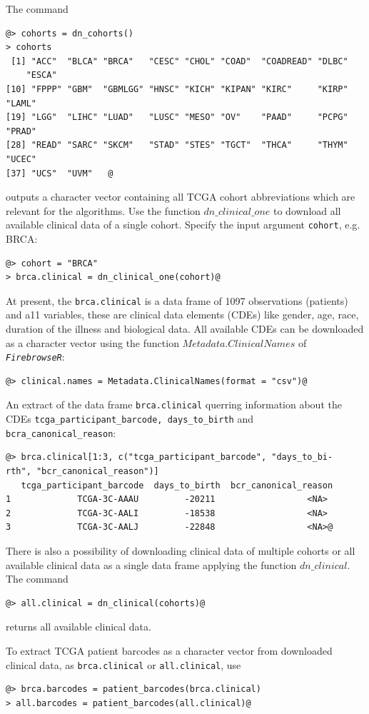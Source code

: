 \documentclass{TechReport}
\begin{document}
The command
\begin{lstlisting}[style=base]
@> cohorts = dn_cohorts()
> cohorts
 [1] "ACC"  "BLCA" "BRCA"   "CESC" "CHOL" "COAD"  "COADREAD" "DLBC"  
    "ESCA"    
[10] "FPPP" "GBM"  "GBMLGG" "HNSC" "KICH" "KIPAN" "KIRC"     "KIRP"  "LAML"    
[19] "LGG"  "LIHC" "LUAD"   "LUSC" "MESO" "OV"    "PAAD"     "PCPG"  "PRAD"    
[28] "READ" "SARC" "SKCM"   "STAD" "STES" "TGCT"  "THCA"     "THYM"  "UCEC"    
[37] "UCS"  "UVM"   @
\end{lstlisting}
outputs a character vector containing all TCGA cohort abbreviations
which are relevant for the algorithms. Use the function
$dn\_clinical\_one$ to download all available clinical data of a
single cohort. Specify the input argument {\tt cohort}, e.g. BRCA:
\begin{lstlisting}[style=base]
@> cohort = "BRCA"
> brca.clinical = dn_clinical_one(cohort)@
\end{lstlisting}
At present, the {\tt brca.clinical} is a data frame of 1097 observations (patients)
and a11 variables, these are clinical data elements (CDEs) like 
gender, age, race, duration of the illness and biological data. All available CDEs
can be downloaded as a character vector using the 
function $Metadata.ClinicalNames$ of \texttt{\em FirebrowseR}:
\begin{lstlisting}[style=base]
@> clinical.names = Metadata.ClinicalNames(format = "csv")@
\end{lstlisting}
An extract of the data frame {\tt brca.clinical} querring information about the CDEs
{\tt tcga\_participant\_barcode, days\_to\_birth} and {\tt bcra\_canonical\_reason}:
\begin{lstlisting}[style=base]
@> brca.clinical[1:3, c("tcga_participant_barcode", "days_to_bi-
rth", "bcr_canonical_reason")]
   tcga_participant_barcode  days_to_birth  bcr_canonical_reason
1             TCGA-3C-AAAU         -20211                  <NA>
2             TCGA-3C-AALI         -18538                  <NA>
3             TCGA-3C-AALJ         -22848                  <NA>@
\end{lstlisting}
There is also a possibility of downloading clinical data of multiple cohorts or all
available clinical data as a single data frame
applying the function $dn\_clinical$. The command
\begin{lstlisting}[style=base]
@> all.clinical = dn_clinical(cohorts)@
\end{lstlisting}
returns all available clinical data.

To extract TCGA patient barcodes as a character vector from downloaded clinical
data, as {\tt brca.clinical} or {\tt all.clinical}, use
\begin{lstlisting}[style=base]
@> brca.barcodes = patient_barcodes(brca.clinical)
> all.barcodes = patient_barcodes(all.clinical)@
\end{lstlisting}
\end{document}
